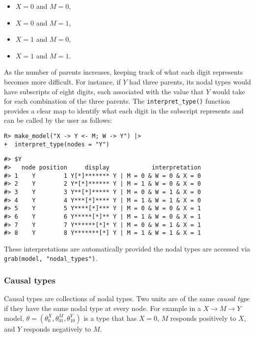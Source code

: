 \documentclass[
  11pt,
  article]{jss}
\providecommand{\tightlist}{%
  \setlength{\itemsep}{0pt}\setlength{\parskip}{0pt}}\usepackage{longtable,booktabs,array}
\begin{document}
\begin{itemize}
\tightlist
\item
  \(X = 0\) and \(M = 0\),
\item
  \(X = 0\) and \(M = 1\),
\item
  \(X = 1\) and \(M = 0\),
\item
  \(X = 1\) and \(M = 1\).
\end{itemize}

As the number of parents increases, keeping track of what each digit
represents becomes more difficult. For instance, if \(Y\) had three
parents, its nodal types would have subscripts of eight digits, each
associated with the value that \(Y\) would take for each combination of
the three parents. The \texttt{interpret\_type()} function provides a
clear map to identify what each digit in the subscript represents and
can be called by the user as follows:

\begin{verbatim}
R> make_model("X -> Y <- M; W -> Y") |> 
+  interpret_type(nodes = "Y")
\end{verbatim}

\begin{verbatim}
#> $Y
#>   node position     display            interpretation
#> 1    Y        1 Y[*]******* Y | M = 0 & W = 0 & X = 0
#> 2    Y        2 Y*[*]****** Y | M = 1 & W = 0 & X = 0
#> 3    Y        3 Y**[*]***** Y | M = 0 & W = 1 & X = 0
#> 4    Y        4 Y***[*]**** Y | M = 1 & W = 1 & X = 0
#> 5    Y        5 Y****[*]*** Y | M = 0 & W = 0 & X = 1
#> 6    Y        6 Y*****[*]** Y | M = 1 & W = 0 & X = 1
#> 7    Y        7 Y******[*]* Y | M = 0 & W = 1 & X = 1
#> 8    Y        8 Y*******[*] Y | M = 1 & W = 1 & X = 1
\end{verbatim}

These interpretations are automatically provided the nodal types are
accessed via \texttt{grab(model,\ "nodal\_types")}.

\hypertarget{sec-causal-types}{%
\subsubsection{Causal types}\label{sec-causal-types}}

Causal types are collections of nodal types. Two units are of the same
\emph{causal type} if they have the same nodal type at every node. For
example in a \(X \rightarrow M \rightarrow Y\) model,
\(\theta = (\theta^X_0, \theta^M_{01}, \theta^Y_{10})\) is a type that
has \(X=0\), \(M\) responds positively to \(X\), and \(Y\) responds
negatively to \(M\).
\end{document}
